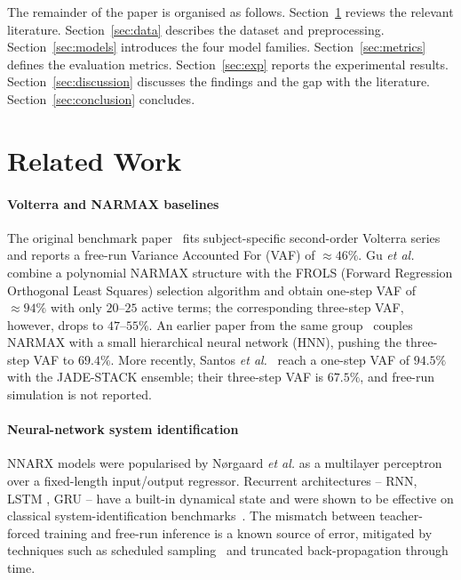 \documentclass[conference]{IEEEtran}
\begin{document}
The remainder of the paper is organised as follows. Section~\ref{sec:rw}
reviews the relevant literature. Section~\ref{sec:data} describes the
dataset and preprocessing. Section~\ref{sec:models} introduces the four
model families. Section~\ref{sec:metrics} defines the evaluation
metrics. Section~\ref{sec:exp} reports the experimental results.
Section~\ref{sec:discussion} discusses the findings and the gap with
the literature. Section~\ref{sec:conclusion} concludes.

\section{Related Work}\label{sec:rw}

\paragraph{Volterra and NARMAX baselines}
The original benchmark paper~\cite{Vlaar2018} fits subject-specific
second-order Volterra series and reports a free-run Variance Accounted
For (VAF) of $\approx 46\%$. Gu \textit{et al.}~\cite{Gu2021}
combine a polynomial NARMAX structure with the FROLS (Forward Regression
Orthogonal Least Squares) selection algorithm and obtain one-step VAF of
$\approx 94\%$ with only $20$--$25$ active terms; the corresponding
three-step VAF, however, drops to $47$--$55\%$. An earlier paper from
the same group~\cite{Gu2018} couples NARMAX with a small hierarchical
neural network (HNN), pushing the three-step VAF to $69.4\%$.
More recently, Santos \textit{et al.}~\cite{Santos2023} reach a one-step
VAF of $94.5\%$ with the JADE-STACK ensemble; their three-step VAF is
$67.5\%$, and free-run simulation is not reported.

\paragraph{Neural-network system identification}
NNARX models were popularised by N{\o}rgaard \textit{et al.}
\cite{Norgaard2000} as a multilayer perceptron over a fixed-length
input/output regressor. Recurrent architectures -- RNN, LSTM
\cite{Hochreiter1997}, GRU \cite{Cho2014} -- have a built-in dynamical
state and were shown to be effective on classical system-identification
benchmarks~\cite{Andersson2019,Forgione2021}. The mismatch between
teacher-forced training and free-run inference is a known source of
error, mitigated by techniques such as scheduled
sampling~\cite{Bengio2015} and truncated back-propagation through time.
\end{document}
